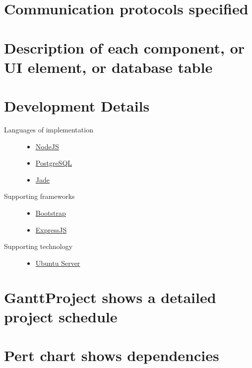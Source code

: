 \documentclass[12pt]{article}
\begin{document}
\section{Communication protocols specified}

%
\section{Description of each component, or UI element, or database table}

%
\section{Development Details}
\begin{description}
  \item[Languages of implementation] \hfill
    \begin{itemize}
      \item \href{https://nodejs.org/en/}{NodeJS}
      \item \href{http://www.postgresql.org/}{PostgreSQL}
      \item \href{http://jade-lang.com/}{Jade}
    \end{itemize}
  \item[Supporting frameworks] \hfill
    \begin{itemize}
      \item \href{http://getbootstrap.com/}{Bootstrap}
      \item \href{http://expressjs.com/}{ExpressJS}
    \end{itemize}
  \item[Supporting technology] \hfill
    \begin{itemize}
      \item \href{http://www.ubuntu.com/server}{Ubuntu Server}
    \end{itemize}
\end{description}
%
\section{GanttProject shows a detailed project schedule}

%
\section{Pert chart shows dependencies}
\end{document}
